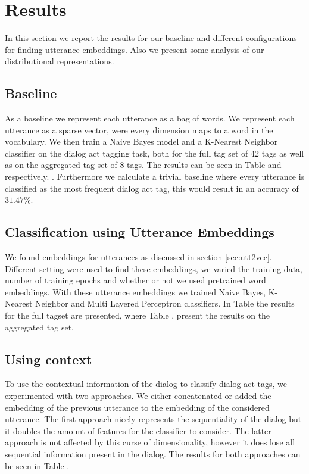 \section{Results}\label{sec:results}
In this section we report the results for our baseline and different configurations for finding utterance embeddings. Also we present some analysis of our distributional representations.

\subsection{Baseline}
As a baseline we represent each utterance as a bag of words. We represent each utterance as a sparse vector, were every dimension maps to a word in the vocabulary. We then train a Naive Bayes model and a K-Nearest Neighbor classifier on the dialog act tagging task, both for the full tag set of 42 tags as well as on the aggregated tag set of 8 tags. The results can be seen in Table  and  respectively. . Furthermore we calculate a trivial baseline where every utterance is classified as the most frequent dialog act tag, this would result in an accuracy of $31.47\%$.

\subsection{Classification using Utterance Embeddings}
We found embeddings for utterances as discussed in section \ref{sec:utt2vec}. Different setting were used to find these embeddings, we varied the training data, number of training epochs and whether or not we used pretrained word embeddings. With these utterance embeddings we trained Naive Bayes, K-Nearest Neighbor and Multi Layered Perceptron classifiers. In Table  the results for the full tagset are presented, where Table , present the results on the aggregated tag set. 

\subsection{Using context}
To use the contextual information of the dialog to classify dialog act tags, we experimented with two  approaches. We either concatenated or added the embedding of the previous utterance to the embedding of the considered utterance. The first approach nicely represents the sequentiality of the dialog but it doubles the amount of features for the classifier to consider. The latter approach is not affected by this curse of dimensionality, however it does lose all sequential information present in the dialog. The results for both approaches can be seen in Table . 

